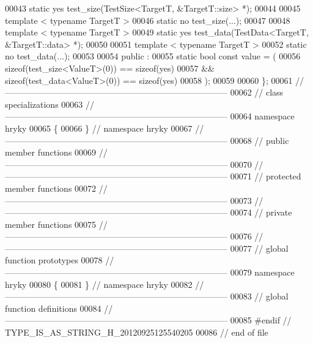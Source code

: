 \begin{DoxyCode}
00043     \textcolor{keyword}{static} yes test\_size(TestSize<TargetT, &TargetT::size> *);
00044     
00045     \textcolor{keyword}{template} < \textcolor{keyword}{typename} TargetT >
00046     \textcolor{keyword}{static} no test\_size(...);
00047 
00048     \textcolor{keyword}{template} < \textcolor{keyword}{typename} TargetT >
00049     \textcolor{keyword}{static} yes test\_data(TestData<TargetT, &TargetT::data> *);
00050     
00051     \textcolor{keyword}{template} < \textcolor{keyword}{typename} TargetT >
00052     \textcolor{keyword}{static} no test\_data(...);
00053 
00054 \textcolor{keyword}{public} :
00055     \textcolor{keyword}{static} \textcolor{keywordtype}{bool} \textcolor{keyword}{const} value = (
00056         \textcolor{keyword}{sizeof}(test\_size<ValueT>(0)) == \textcolor{keyword}{sizeof}(yes)
00057         && \textcolor{keyword}{sizeof}(test\_data<ValueT>(0)) == \textcolor{keyword}{sizeof}(yes)
00058         );
00059     
00060 \};
00061 \textcolor{comment}{//
      ------------------------------------------------------------------------------}
00062 \textcolor{comment}{// class specializations}
00063 \textcolor{comment}{//
      ------------------------------------------------------------------------------}
00064 \textcolor{keyword}{namespace }hryky
00065 \{
00066 \} \textcolor{comment}{// namespace hryky}
00067 \textcolor{comment}{//
      ------------------------------------------------------------------------------}
00068 \textcolor{comment}{// public member functions}
00069 \textcolor{comment}{//
      ------------------------------------------------------------------------------}
00070 \textcolor{comment}{//
      ------------------------------------------------------------------------------}
00071 \textcolor{comment}{// protected member functions}
00072 \textcolor{comment}{//
      ------------------------------------------------------------------------------}
00073 \textcolor{comment}{//
      ------------------------------------------------------------------------------}
00074 \textcolor{comment}{// private member functions}
00075 \textcolor{comment}{//
      ------------------------------------------------------------------------------}
00076 \textcolor{comment}{//
      ------------------------------------------------------------------------------}
00077 \textcolor{comment}{// global function prototypes}
00078 \textcolor{comment}{//
      ------------------------------------------------------------------------------}
00079 \textcolor{keyword}{namespace }hryky
00080 \{
00081 \} \textcolor{comment}{// namespace hryky}
00082 \textcolor{comment}{//
      ------------------------------------------------------------------------------}
00083 \textcolor{comment}{// global function definitions}
00084 \textcolor{comment}{//
      ------------------------------------------------------------------------------}
00085 \textcolor{preprocessor}{#endif // TYPE\_IS\_AS\_STRING\_H\_20120925125540205}
00086 \textcolor{preprocessor}{}\textcolor{comment}{// end of file}
\end{DoxyCode}
